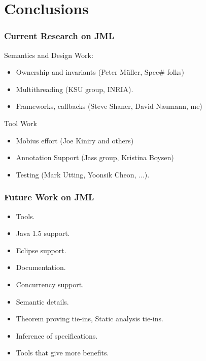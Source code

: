 \section[Concl.]{Conclusions}



\begin{frame}
\frametitle{Current Research on JML}

Semantics and Design Work:
\begin{itemize}
\item
Ownership and invariants (Peter M\"{u}ller, Spec\# folks)

\item
Multithreading (KSU group, INRIA).

\item
Frameworks, callbacks (Steve Shaner, David Naumann, me)
\end{itemize}

Tool Work
\begin{itemize}
\item
Mobius effort (Joe Kiniry and others)

\item
Annotation Support (Jass group, Kristina Boysen)

\item
Testing (Mark Utting, Yoonsik Cheon, $\ldots$).
\end{itemize}
\end{frame}


\begin{frame}
\frametitle{Future Work on JML}
\begin{itemize}
\item
Tools.

\item
Java 1.5 support.

\item
Eclipse support.

\item
Documentation.

\item
Concurrency support.

\item
Semantic details.

\item
Theorem proving tie-ins, Static analysis tie-ins.

\item
Inference of specifications.

\item
Tools that give more benefits.
\end{itemize}
\end{frame}

